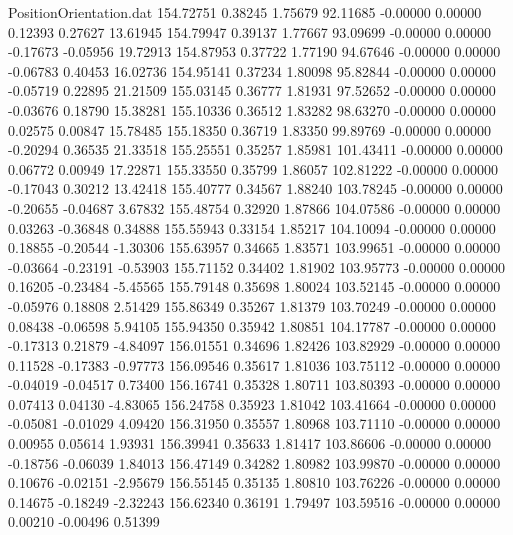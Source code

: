 \begin{filecontents}{PositionOrientation.dat}
 154.72751    0.38245    1.75679    92.11685   -0.00000    0.00000    0.12393    0.27627   13.61945
 154.79947    0.39137    1.77667    93.09699   -0.00000    0.00000   -0.17673   -0.05956   19.72913
 154.87953    0.37722    1.77190    94.67646   -0.00000    0.00000   -0.06783    0.40453   16.02736
 154.95141    0.37234    1.80098    95.82844   -0.00000    0.00000   -0.05719    0.22895   21.21509
 155.03145    0.36777    1.81931    97.52652   -0.00000    0.00000   -0.03676    0.18790   15.38281
 155.10336    0.36512    1.83282    98.63270   -0.00000    0.00000    0.02575    0.00847   15.78485
 155.18350    0.36719    1.83350    99.89769   -0.00000    0.00000   -0.20294    0.36535   21.33518
 155.25551    0.35257    1.85981   101.43411   -0.00000    0.00000    0.06772    0.00949   17.22871
 155.33550    0.35799    1.86057   102.81222   -0.00000    0.00000   -0.17043    0.30212   13.42418
 155.40777    0.34567    1.88240   103.78245   -0.00000    0.00000   -0.20655   -0.04687    3.67832
 155.48754    0.32920    1.87866   104.07586   -0.00000    0.00000    0.03263   -0.36848    0.34888
 155.55943    0.33154    1.85217   104.10094   -0.00000    0.00000    0.18855   -0.20544   -1.30306
 155.63957    0.34665    1.83571   103.99651   -0.00000    0.00000   -0.03664   -0.23191   -0.53903
 155.71152    0.34402    1.81902   103.95773   -0.00000    0.00000    0.16205   -0.23484   -5.45565
 155.79148    0.35698    1.80024   103.52145   -0.00000    0.00000   -0.05976    0.18808    2.51429
 155.86349    0.35267    1.81379   103.70249   -0.00000    0.00000    0.08438   -0.06598    5.94105
 155.94350    0.35942    1.80851   104.17787   -0.00000    0.00000   -0.17313    0.21879   -4.84097
 156.01551    0.34696    1.82426   103.82929   -0.00000    0.00000    0.11528   -0.17383   -0.97773
 156.09546    0.35617    1.81036   103.75112   -0.00000    0.00000   -0.04019   -0.04517    0.73400
 156.16741    0.35328    1.80711   103.80393   -0.00000    0.00000    0.07413    0.04130   -4.83065
 156.24758    0.35923    1.81042   103.41664   -0.00000    0.00000   -0.05081   -0.01029    4.09420
 156.31950    0.35557    1.80968   103.71110   -0.00000    0.00000    0.00955    0.05614    1.93931
 156.39941    0.35633    1.81417   103.86606   -0.00000    0.00000   -0.18756   -0.06039    1.84013
 156.47149    0.34282    1.80982   103.99870   -0.00000    0.00000    0.10676   -0.02151   -2.95679
 156.55145    0.35135    1.80810   103.76226   -0.00000    0.00000    0.14675   -0.18249   -2.32243
 156.62340    0.36191    1.79497   103.59516   -0.00000    0.00000    0.00210   -0.00496    0.51399

\end{filecontents}
